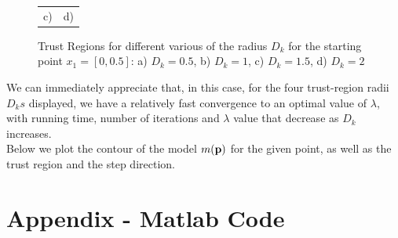 \documentclass[a4paper,11pt]{article}
\begin{document}
\begin{figure}[!ht]
\begin{tabular}{cc}
		c) & d)\\
	\end{tabular}
	\caption{Trust Regions for different various of the radius $D_{k}$ for the starting point $x_{1}=[0,0.5]$: a) $D_{k}=0.5$, b) $D_{k}=1$, c) $D_{k}=1.5$, d) $D_{k}=2$}
	\label{}
\end{figure}

We can immediately appreciate that, in this case, for the four  trust-region radii $D_{k}s$ displayed, we have a relatively fast convergence to an optimal value of $\lambda$, with running time, number of iterations and $\lambda$ value that decrease as $D_{k}$ increases.\\
Below we plot the contour of the model $m({\bf p})$ for the given point, as well as the trust region and the step direction.

\clearpage
\section*{Appendix - Matlab Code}

\end{document}
